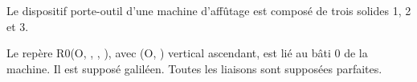 \documentclass[10pt,fleqn]{article} %
\begin{document}
\def\pathfig{images}

\vspace{5cm}
\pagestyle{fancy}
\thispagestyle{plain}

\def\columnseprulecolor{\color{ocre}}
\setlength{\columnseprule}{0.4pt} 

\def\pathfig{images}

\ifprof
\else
\begin{multicols}{2}
\fi

Le dispositif porte-outil d'une machine d'affûtage est composé de trois solides 1, 2 et 3. 

Le repère R0(O, , , ), avec (O,  ) vertical ascendant, est lié au bâti 0 de la machine. Il est supposé galiléen. 
Toutes les liaisons sont supposées parfaites.
%


\ifprof
\else
\end{multicols}
\fi



\end{document}
